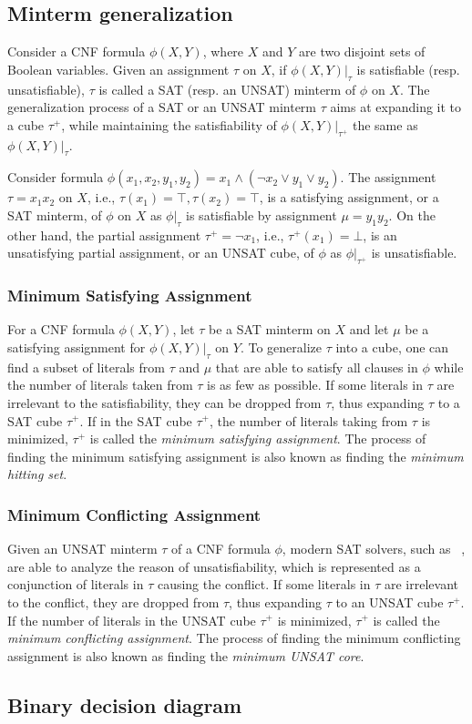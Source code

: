 \subsection{Minterm generalization}
Consider a CNF formula $\phi(X,Y)$, where $X$ and $Y$ are two disjoint sets of Boolean variables.
Given an assignment $\tau$ on $X$, if $\phi(X,Y)|_\tau$ is satisfiable (resp. unsatisfiable), $\tau$ is called a SAT (resp. an UNSAT) minterm of $\phi$ on $X$.
The generalization process of a SAT or an UNSAT minterm $\tau$ aims at expanding it to a cube $\tau^+$, while maintaining the satisfiability of $\phi(X,Y)|_{\tau^+}$ the same as $\phi(X,Y)|_\tau$.
\begin{example}\label{ex:assign}
    Consider formula $\phi(x_1, x_2, y_1, y_2)=x_1 \wedge (\neg x_2 \vee y_1 \vee y_2)$. The assignment $\tau = x_1 x_2$ on $X$, i.e., $\tau(x_1)=\top, \tau(x_2)=\top$, is a satisfying assignment, or a SAT minterm, of $\phi$ on $X$ as $\phi|_\tau$ is satisfiable by assignment $\mu = y_1y_2$.
    On the other hand, the partial assignment $\tau^+ = \neg x_1$, i.e., $\tau^+(x_1)=\bot$, is an unsatisfying partial assignment, or an UNSAT cube, of $\phi$ as $\phi|_{\tau^+}$ is unsatisfiable.
\end{example}

\subsubsection{Minimum Satisfying Assignment}
For a CNF formula $\phi(X,Y)$, let $\tau$ be a SAT minterm on $X$ and let $\mu$ be a satisfying assignment for $\phi(X,Y)|_\tau$ on $Y$. To generalize $\tau$ into a cube, one can find a subset of literals from $\tau$ and $\mu$ that are able to satisfy all clauses in $\phi$ while the number of literals taken from $\tau$ is as few as possible. If some literals in $\tau$ are irrelevant to the satisfiability, they can be dropped from $\tau$, thus expanding $\tau$ to a SAT cube $\tau^+$. If in the SAT cube $\tau^+$, the number of literals taking from $\tau$ is minimized, $\tau^+$ is called the \textit{minimum satisfying assignment}. The process of finding the minimum satisfying assignment is also known as finding the \textit{minimum hitting set}.

\subsubsection{Minimum Conflicting Assignment}
Given an UNSAT minterm $\tau$ of a CNF formula $\phi$,
modern SAT solvers, such as \minisat~\cite{Een2003Solver,Een2003Incremental},
are able to analyze the reason of unsatisfiability,
which is represented as a conjunction of literals in $\tau$ causing the conflict.
If some literals in $\tau$ are irrelevant to the conflict, they are dropped from $\tau$, thus expanding $\tau$ to an UNSAT cube $\tau^+$.
If the number of literals in the UNSAT cube $\tau^+$ is minimized, $\tau^+$ is called the \textit{minimum conflicting assignment}.
The process of finding the minimum conflicting assignment is also known as finding the \textit{minimum UNSAT core}.


\subsection{Binary decision diagram}